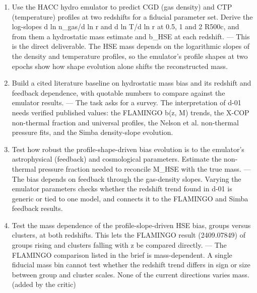 \documentclass[11pt,a4paper]{article}
\begin{document}
\begin{enumerate}
  \item Use the HACC hydro emulator to predict CGD (gas density) and CTP (temperature) profiles at two redshifts for a fiducial parameter set. Derive the log-slopes d ln n\_gas/d ln r and d ln T/d ln r at 0.5, 1 and 2 R500c, and from them a hydrostatic mass estimate and b\_HSE at each redshift. --- This is the direct deliverable. The HSE mass depends on the logarithmic slopes of the density and temperature profiles, so the emulator's profile shapes at two epochs show how shape evolution alone shifts the reconstructed mass.
  \item Build a cited literature baseline on hydrostatic mass bias and its redshift and feedback dependence, with quotable numbers to compare against the emulator results. --- The task asks for a survey. The interpretation of d-01 needs verified published values: the FLAMINGO b(z, M) trends, the X-COP non-thermal fraction and universal profiles, the Nelson et al. non-thermal pressure fits, and the Simba density-slope evolution.
  \item Test how robust the profile-shape-driven bias evolution is to the emulator's astrophysical (feedback) and cosmological parameters. Estimate the non-thermal pressure fraction needed to reconcile M\_HSE with the true mass. --- The bias depends on feedback through the gas-density slopes. Varying the emulator parameters checks whether the redshift trend found in d-01 is generic or tied to one model, and connects it to the FLAMINGO and Simba feedback results.
  \item Test the mass dependence of the profile-slope-driven HSE bias, groups versus clusters, at both redshifts. This lets the FLAMINGO result (2409.07849) of groups rising and clusters falling with z be compared directly. --- The FLAMINGO comparison listed in the brief is mass-dependent. A single fiducial mass bin cannot test whether the redshift trend differs in sign or size between group and cluster scales. None of the current directions varies mass. (added by the critic)

\end{enumerate}
\end{document}
